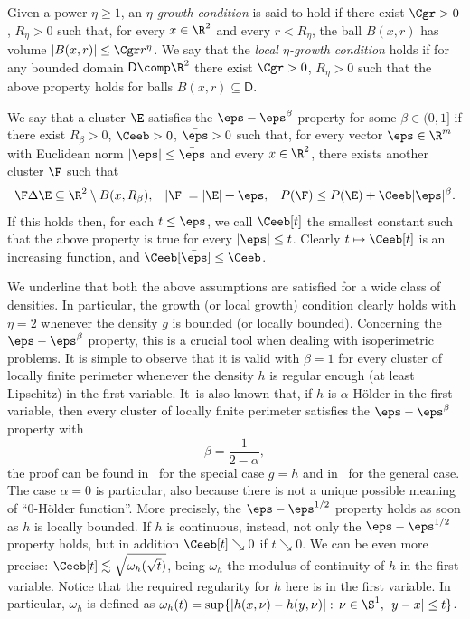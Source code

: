 \begin{defn}\label{defge}
Given a power $\eta\ge 1$, an \emph{$\eta$-growth condition} is said to hold if there exist $\Cgr>0$, $R_\eta>0$ such that, for every $x\in\R^2$ and every $r<R_\eta$, the ball $B(x,r)$ has volume $|B(x,r)|\leq \Cgr r^\eta$. We say that the \emph{local $\eta$-growth condition} holds if for any bounded domain $\mathsf{D}\comp \R^2$ there exist $\Cgr>0$, $R_\eta>0$ such that the above property holds for balls $B(x,r)\subseteq \mathsf{D}$.\par
We say that a cluster $\E$ satisfies the $\eps-\eps^\beta$ property for some $\beta\in(0,1]$ if there exist $R_\beta>0$, $\Ceeb>0$, $\bar\eps>0$ such that, for every vector $\eps\in\R^m$ with Euclidean norm $|\eps|\leq \bar\eps$ and every $x\in\R^2$, there exists another cluster $\F$ such that\vspace*{-3pt}
\begin{align}\label{propeeb}
\F\Delta \E \subseteq \R^2\setminus B(x,R_\beta), &&
|\F|=|\E|+\eps, &&
P(\F)\leq P(\E) + \Ceeb |\eps|^\beta.
\end{align}
If this holds then, for each $t\leq \bar\eps$, we call $\Ceeb[t]$ the smallest constant such that the above property is true for every $|\eps|\leq t$. Clearly $t\mapsto \Ceeb[t]$ is an increasing function, and $\Ceeb[\bar\eps]\leq \Ceeb$.
\end{defn}

We underline that both the above assumptions are satisfied for a wide class of densities. In particular, the growth (or local growth) condition clearly holds with $\eta=2$ whenever the density $g$ is bounded (or locally bounded). Concerning the $\eps-\eps^\beta$ property, this is a crucial tool when dealing with isoperimetric problems. It is simple to observe that it is valid with $\beta=1$ for every cluster of locally finite perimeter whenever the density $h$ is regular enough (at least Lipschitz) in the first variable. It~is also known that, if $h$ is $\alpha$-H\"older in the first variable, then every cluster of locally finite perimeter satisfies the $\eps-\eps^\beta$ property with\vspace*{-3pt}
\[
\beta=\frac 1{2-\alpha},
\]
the proof can be found in~\cite{CP} for the special case $g=h$ and in~\cite{PS19} for the general case. The case $\alpha=0$ is particular, also because there is not a unique possible meaning of ``$0$-H\"older function''. More precisely, the $\eps-\eps^{1/2}$ property holds as soon as $h$ is locally bounded. If $h$ is continuous, instead, not only the $\eps-\eps^{1/2}$ property holds, but in addition $\Ceeb[t]\searrow 0$ if $t\searrow 0$. We can be even more precise: $\Ceeb[t]\lesssim \sqrt{\omega_h(\sqrt t)}$, being $\omega_h$ the modulus of continuity of $h$ in the first variable. Notice that the required regularity for $h$ here is in the first variable. In particular, $\omega_h$ is defined as $\omega_h(t)=\sup \{|h(x,\nu)-h(y,\nu)|:\, \nu\in\S^1,\, |y-x|\leq t\}$.

